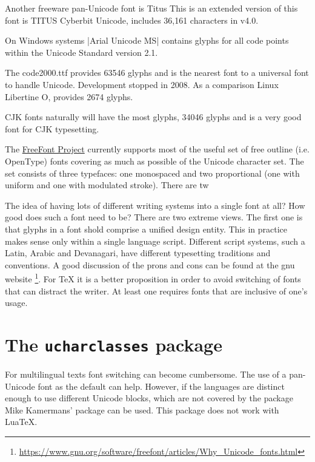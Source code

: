 Another freeware pan-Unicode font is Titus
This is an extended version of this font is TITUS Cyberbit Unicode, includes 36,161 characters in v4.0.

On Windows systems |Arial Unicode MS| contains glyphs for all code points within the Unicode Standard version 2.1.  

The code2000.ttf provides 63546 glyphs and is the nearest font to a universal font to handle Unicode. Development stopped in 2008. As a comparison Linux Libertine O, provides 2674 glyphs. 

CJK fonts naturally will have the most glyphs,  34046 glyphs and is a very good font for CJK typesetting.

The \href{http://ftp.gnu.org/gnu/freefont/}{FreeFont Project} currently supports most of the useful set of free outline (i.e. OpenType) fonts covering as much as possible of the Unicode character set. The set consists of three typefaces: one monospaced and two proportional (one with uniform and one with modulated stroke). There are tw

The idea of having lots of different writing systems into a single font at all? How good does such a font need to be?
There are two extreme views.  The first one is that glyphs in a font shold comprise a unified design entity. This in practice makes sense only within a single language script. Different script systems, such a Latin, Arabic and Devanagari, have different typesetting traditions and conventions.  A good discussion of the prons and cons can be found at the gnu website \footnote{\protect\url{https://www.gnu.org/software/freefont/articles/Why_Unicode_fonts.html}}. For TeX it is a better proposition in order to avoid switching of fonts that can distract the writer. At least one requires fonts that are inclusive of one's usage. 

\section{The \texttt{ucharclasses} package}

For multilingual texts font switching can become cumbersome. The use of a pan-Unicode font as the default can help. However, if the languages are distinct enough to use different Unicode blocks, which are not covered by the  package Mike Kamermans' package  can be used. This package does not work with LuaTeX. 

